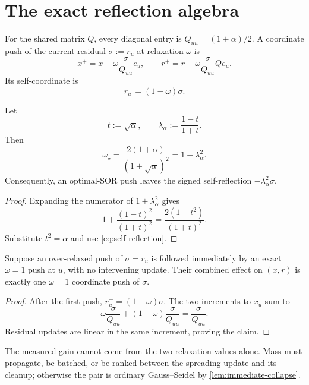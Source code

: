 \section{The exact reflection algebra}
\label{sec:algebra}

For the shared matrix $Q$, every diagonal entry is
$Q_{uu}=(1+\alpha)/2$.  A coordinate push of the current residual
$\sigma:=r_u$ at relaxation $\omega$ is
\begin{equation}
 x^+=x+\omega\frac{\sigma}{Q_{uu}}e_u,
 \qquad
 r^+=r-\omega\frac{\sigma}{Q_{uu}}Qe_u.
 \label{eq:sor-push}
\end{equation}
Its self-coordinate is
\begin{equation}
 r_u^+=(1-\omega)\sigma.
 \label{eq:self-reflection}
\end{equation}

\begin{lemma}
\label{lem:optimal-parameterization}
Let
\begin{equation}
 t:=\sqrt\alpha,
 \qquad
 \lambda_\alpha:=\frac{1-t}{1+t}.
 \label{eq:lambda-alpha}
\end{equation}
Then
\begin{equation}
 \omega_\star
 =\frac{2(1+\alpha)}{(1+\sqrt\alpha)^2}
 =1+\lambda_\alpha^2.
 \label{eq:omega-lambda}
\end{equation}
Consequently, an optimal-SOR push leaves the signed self-reflection
$-\lambda_\alpha^2\sigma$.
\end{lemma}

\begin{proof}
Expanding the numerator of $1+\lambda_\alpha^2$ gives
\[
 1+\frac{(1-t)^2}{(1+t)^2}
 =\frac{2(1+t^2)}{(1+t)^2}.
\]
Substitute $t^2=\alpha$ and use \cref{eq:self-reflection}.
\end{proof}

\begin{lemma}
\label{lem:immediate-collapse}
Suppose an over-relaxed push of $\sigma=r_u$ is followed immediately by an
exact $\omega=1$ push at $u$, with no intervening update.  Their combined
effect on $(x,r)$ is exactly one $\omega=1$ coordinate push of $\sigma$.
\end{lemma}

\begin{proof}
After the first push, $r_u^+=(1-\omega)\sigma$.  The two increments to $x_u$
sum to
\[
 \omega\frac{\sigma}{Q_{uu}}
 +(1-\omega)\frac{\sigma}{Q_{uu}}
 =\frac{\sigma}{Q_{uu}}.
\]
Residual updates are linear in the same increment, proving the claim.
\end{proof}

\begin{remark}
The measured gain cannot come from the two relaxation values alone.  Mass
must propagate, be batched, or be ranked between the spreading update and its
cleanup; otherwise the pair is ordinary Gauss--Seidel by
\cref{lem:immediate-collapse}.
\end{remark}
